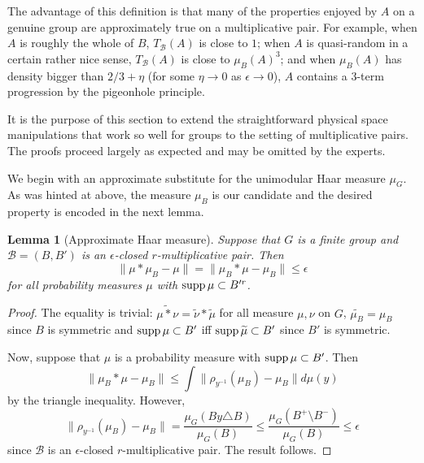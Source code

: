 \documentclass[12pt]{amsart}
\numberwithin{equation}{section}
\theoremstyle{plain}
\newtheorem{lemma}[subsection]{Lemma}
\theoremstyle{definition}
\renewcommand{\leq}{\leqslant}
\providecommand{\supp}{\mathop{\rm supp}\nolimits}
\begin{document}
The advantage of this definition is that many of the properties enjoyed by $A$ on a genuine group are approximately true on a multiplicative pair. For example, when $A$ is roughly the whole of $B$, $T_\mathcal{B}(A)$ is close to $1$; when $A$ is quasi-random in a certain rather nice sense, $T_{\mathcal{B}}(A)$ is close to $\mu_B(A)^3$; and when $\mu_B(A)$ has density bigger than $2/3+\eta$ (for some $\eta \rightarrow 0$ as $\epsilon \rightarrow 0$), $A$ contains a $3$-term progression by the pigeonhole principle.

It is the purpose of this section to extend the straightforward physical space manipulations that work so well for groups to the setting of multiplicative pairs.  The proofs proceed largely as expected and may be omitted by the experts.

We begin with an approximate substitute for the unimodular Haar measure $\mu_G$.  As was hinted at above, the measure $\mu_B$ is our candidate and the desired property is encoded in the next lemma.\begin{lemma}[Approximate Haar measure]\label{lem.approxhaar}  Suppose that $G$ is a finite group and $\mathcal{B}=(B,B')$ is an $\epsilon$-closed $r$-multiplicative pair.  Then
\begin{equation*}
\|\mu \ast \mu_B - \mu\| = \|\mu_B \ast \mu - \mu_B\| \leq \epsilon
\end{equation*}
for all probability measures $\mu$ with $\supp \mu \subset B'^r$.
\end{lemma}
\begin{proof}
The equality is trivial: $\widetilde{\mu \ast \nu} = \widetilde{\nu}\ast \widetilde{\mu}$ for all measure $\mu,\nu$ on $G$, $\widetilde{\mu_{B}}=\mu_B$ since $B$ is symmetric and $\supp \mu \subset B'$ iff $\supp \widetilde{\mu} \subset B'$ since $B'$ is symmetric.

Now, suppose that $\mu$ is a probability measure with $\supp \mu \subset B'$.  Then
\begin{equation*}
\|\mu_B \ast \mu - \mu_B\| \leq \int{\|\rho_{y^{-1}}(\mu_B)-\mu_B\|d\mu(y)}
\end{equation*}
by the triangle inequality.  However,
\begin{equation*}
\|\rho_{y^{-1}}(\mu_B)-\mu_B\| = \frac{\mu_G(By \triangle B)}{\mu_G(B)} \leq \frac{\mu_G(B^+ \setminus B^-)}{\mu_G(B)} \leq \epsilon
\end{equation*}
since $\mathcal{B}$ is an $\epsilon$-closed $r$-multiplicative pair.  The result follows.
\end{proof}
\end{document}
